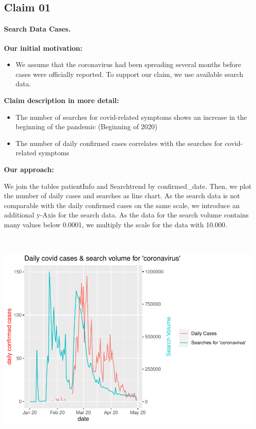 \documentclass[
]{article}
\providecommand{\tightlist}{%
  \setlength{\itemsep}{0pt}\setlength{\parskip}{0pt}}
\begin{document}
\hypertarget{claim-01}{%
\subsection{Claim 01}\label{claim-01}}

\hypertarget{search-data-cases.}{%
\paragraph{Search Data Cases.}\label{search-data-cases.}}

\textbf{Our initial motivation:}

\begin{itemize}
\tightlist
\item
  We assume that the coronavirus had been spreading several months
  before cases were officially reported. To support our claim, we use
  available search data.
\end{itemize}

\textbf{Claim description in more detail:}

\begin{itemize}
\tightlist
\item
  The number of searches for covid-related symptoms shows an increase in
  the beginning of the pandemic (Beginning of 2020)
\item
  The number of daily confirmed cases correlates with the searches for
  covid-related symptoms
\end{itemize}

\textbf{Our approach:}

We join the tables patientInfo and Searchtrend by confirmed\_date. Then,
we plot the number of daily cases and searches as line chart. As the
search data is not comparable with the daily confirmed cases on the same
scale, we introduce an additional y-Axis for the search data. As the
data for the search volume contains many values below 0.0001, we
multiply the scale for the data with 10.000.

~

\includegraphics{Main_Analysis_files/figure-latex/unnamed-chunk-5-1.pdf}
\end{document}
